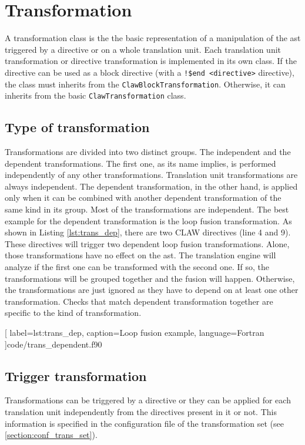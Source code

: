 \chapter{Transformation}
\label{chapter:transformation}
A transformation class is the the basic representation of a manipulation of the
\gls{ast} triggered by a directive or on a whole translation unit. Each
translation unit transformation or directive transformation is implemented in
its own class. If the directive can be used as a block directive (with a
\lstinline|!$end <directive>| directive), the class must inherits from the
\lstinline!ClawBlockTransformation!. Otherwise, it can inherits from the basic
\lstinline!ClawTransformation! class.

\section{Type of transformation}
\label{section:trans_type}
Transformations are divided into two distinct groups. The independent and the
dependent transformations. The first one, as its name implies, is performed
independently of any other transformations. Translation unit transformations
are always independent. The dependent transformation, in the
other hand, is applied only when it can be combined with another dependent
transformation of the same kind in its group. Most of the transformations are
independent. The best example for the dependent transformation is the loop
fusion transformation. As shown in Listing \ref{lst:trans_dep}, there are two
CLAW directives (line 4 and 9). These directives will trigger two dependent loop
fusion transformations. Alone, those transformations have no effect
on the \gls{ast}. The translation engine will analyze if the
first one can be transformed with the second one. If so, the transformations will
be grouped together and the fusion will happen. Otherwise, the transformations
are just ignored as they have to depend on at least one other transformation.
Checks that match dependent transformation together are specific to the kind
of transformation.


  [
    label=lst:trans_dep,
    caption=Loop fusion example,
    language=Fortran
  ]{code/trans_dependent.f90}

\section{Trigger transformation}
\label{section:trans_trigger}
Transformations can be triggered by a directive or they can be applied for each
translation unit independently from the directives present in it or not.
This information is specified in the configuration file of the transformation
set (see \ref{section:conf_trans_set}).


